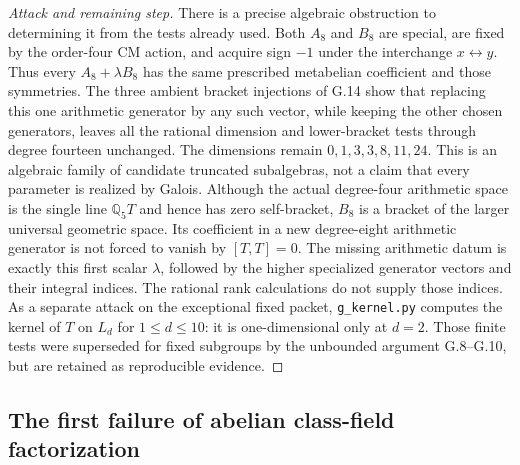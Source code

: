\begin{proof}[Attack and remaining step]
There is a precise algebraic obstruction to determining it from
the tests already used. Both $A_8$ and $B_8$ are special, are
fixed by the order-four CM action, and acquire sign $-1$ under
the interchange $x\leftrightarrow y$. Thus every
$A_8+\lambda B_8$ has the same prescribed metabelian coefficient
and those symmetries. The three ambient bracket injections of
G.14 show that replacing this one arithmetic generator by any
such vector, while keeping the other chosen generators, leaves
all the rational dimension and lower-bracket tests through
degree fourteen unchanged. The dimensions remain
$0,1,3,3,8,11,24$. This is an algebraic family of candidate
truncated subalgebras, not a claim that every parameter is
realized by Galois. Although the actual degree-four arithmetic
space is the single line $\mathbb Q_5T$ and hence has zero
self-bracket, $B_8$ is a bracket of the larger universal
geometric space. Its coefficient in a new degree-eight
arithmetic generator is not forced to vanish by
$[T,T]=0$. The missing arithmetic datum is exactly this first
scalar $\lambda$, followed by the higher specialized generator
vectors and their integral indices.
The rational rank calculations do not supply those indices.
As a separate attack on the exceptional fixed
packet, \texttt{g\_kernel.py} computes the kernel of $T$ on
$L_d$ for $1\le d\le10$: it is one-dimensional only at $d=2$.
Those finite tests were superseded for fixed subgroups by the
unbounded argument G.8--G.10, but are retained as reproducible
evidence.
\end{proof}

\subsection{The first failure of abelian class-field factorization}

